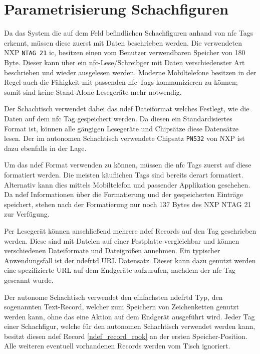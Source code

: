 \hypertarget{parametrisierung-schachfiguren}{%
\section{Parametrisierung
Schachfiguren}\label{parametrisierung-schachfiguren}}

Da das System die auf dem Feld befindlichen Schachfiguren anhand von
\gls{nfc} Tags erkennt, müssen diese zuerst mit Daten beschrieben
werden. Die verwendeten NXP
\passthrough{\lstinline!NTAG 21!}\cite{nxpntag21} \gls{ic}, besitzen
einen vom Benutzer verwendbaren Speicher von 180 Byte. Dieser kann über
ein \gls{nfc}-Lese/Schreibger mit Daten verschiedenster Art beschrieben
und wieder ausgelesen werden. Moderne Mobiltelefone besitzen in der
Regel auch die Fähigkeit mit passenden \gls{nfc} Tags kommunizieren zu
können; somit sind keine Stand-Alone Lesegeräte mehr notwendig.

Der Schachtisch verwendet dabei das \gls{ndef} Dateiformat welches
Festlegt, wie die Daten auf dem \gls{nfc} Tag gespeichert werden. Da
diesen ein Standardisiertes Format ist, können alle gängigen Lesegeräte
und Chipsätze diese Datensätze lesen. Der im autonomen Schachtisch
verwendete Chipsatz \passthrough{\lstinline!PN532!} von NXP ist dazu
ebenfalls in der Lage.

Um das \gls{ndef} Format verwenden zu können, müssen die \gls{nfc} Tags
zuerst auf diese formatiert werden. Die meisten käuflichen Tags sind
bereits derart formatiert. Alternativ kann dies mittels Mobiltelefon und
passender Applikation geschehen. Da \gls{ndef} Informationen über die
Formatierung und der gespeicherten Einträge speichert, stehen nach der
Formatierung nur noch 137 Bytes des NXP NTAG 21 zur Verfügung.

Per Lesegerät können anschließend mehrere \gls{ndef} Records auf den Tag
geschrieben werden. Diese sind mit Dateien auf einer Festplatte
vergleichbar und können verschiedenen Dateiformate und Dateigrößen
annehmen. Ein typischer Anwendungsfall ist der \gls{ndefrtd} URL
Datensatz. Dieser kann dazu genutzt werden eine spezifizierte URL auf
dem Endgeräte aufzurufen, nachdem der \gls{nfc} Tag gescannt wurde.
\cite{nordicnfclibndef}

Der autonome Schachtisch verwendet den einfachsten \gls{ndefrtd} Typ,
den sogenannten Text-Record, welcher zum Speichern von Zeichenketten
genutzt werden kann, ohne das eine Aktion auf dem Endgerät ausgeführt
wird. Jeder Tag einer Schachfigur, welche für den autonomen Schachtisch
verwendet werden kann, besitzt diesen \gls{ndef} Record
\ref{ndef_record_rook} an der ersten Speicher-Position. Alle weiteren
eventuell vorhandenen Records werden vom Tisch ignoriert.
\cite{nordicnfclib}

